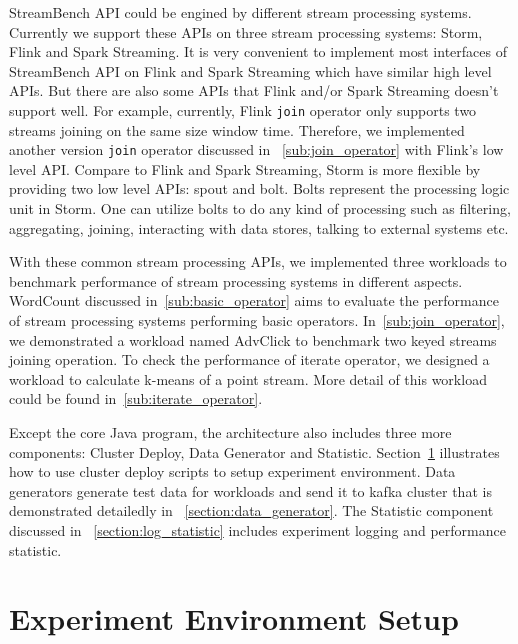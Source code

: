 StreamBench API could be engined by different stream processing systems. Currently we support these APIs on three stream processing systems: Storm, Flink and Spark Streaming. It is very convenient to implement most interfaces of StreamBench API on Flink and Spark Streaming which have similar high level APIs. But there are also some APIs that Flink and/or Spark Streaming doesn't support well. For example, currently, Flink \texttt{join} operator only supports two streams joining on the same size window time. Therefore, we implemented another version \texttt{join} operator discussed in ~\cref{sub:join_operator} with Flink's low level API. Compare to Flink and Spark Streaming, Storm is more flexible by providing two low level APIs: spout and bolt. Bolts represent the processing logic unit in Storm. One can utilize bolts to do any kind of processing such as filtering, aggregating, joining, interacting with data stores, talking to external systems etc.

With these common stream processing APIs, we implemented three workloads to benchmark performance of stream processing systems in different aspects. WordCount discussed in~\cref{sub:basic_operator} aims to evaluate the performance of stream processing systems performing basic operators. In~\cref{sub:join_operator}, we demonstrated a workload named AdvClick to benchmark two keyed streams joining operation. To check the performance of iterate operator, we designed a workload to calculate k-means of a point stream. More detail of this workload could be found in~\cref{sub:iterate_operator}.

Except the core Java program, the architecture also includes three more components: Cluster Deploy, Data Generator and Statistic. Section~\ref{chapter:environment_setup} illustrates how to use cluster deploy scripts to setup experiment environment. Data generators generate test data for workloads and send it to kafka cluster that is demonstrated detailedly in ~\cref{section:data_generator}. The Statistic component discussed in ~\cref{section:log_statistic} includes experiment logging and performance statistic. 


\section{Experiment Environment Setup}
\label{chapter:environment_setup}

